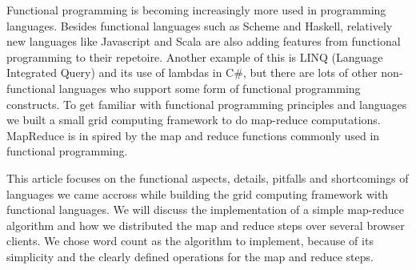 Functional programming is becoming increasingly more used in programming languages. Besides functional languages such as Scheme and Haskell, relatively new languages like Javascript and Scala are also adding features from functional programming to their repetoire. Another example of this is LINQ (Language Integrated Query) 
and its use of lambdas in C\#, but there are lots of other non-functional languages who support some form of functional programming constructs.
To get familiar with functional programming principles and languages we built a small grid computing framework to do map-reduce computations.
MapReduce is in spired by the map and reduce functions commonly used in functional programming.

This article focuses on the functional aspects, details, pitfalls and shortcomings of languages we came accross while building the grid computing framework
with functional languages. We will discuss the implementation of a simple map-reduce algorithm and how we distributed the map and reduce steps over several browser clients. 
We chose word count as the algorithm to implement, because of its simplicity and the clearly defined operations for the map and reduce steps.
